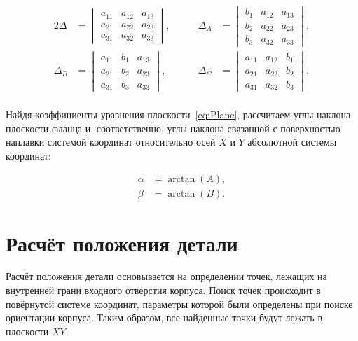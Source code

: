 \begin{alignat*}{2}
    \Delta &= \begin{vmatrix}
                  a_{11} & a_{12} & a_{13} \\
                  a_{21} & a_{22} & a_{23} \\
                  a_{31} & a_{32} & a_{33}
    \end{vmatrix}, & \qquad
    \Delta_A &= \begin{vmatrix}
                    b_1 & a_{12} & a_{13} \\
                    b_2 & a_{22} & a_{23} \\
                    b_3 & a_{32} & a_{33}
    \end{vmatrix}, \\
    \Delta_B &= \begin{vmatrix}
                    a_{11} & b_1 & a_{13} \\
                    a_{21} & b_2 & a_{23} \\
                    a_{31} & b_3 & a_{33}
    \end{vmatrix}, & \qquad
    \Delta_C &= \begin{vmatrix}
                    a_{11} & a_{12} & b_1 \\
                    a_{21} & a_{22} & b_2 \\
                    a_{31} & a_{32} & b_3
    \end{vmatrix}.
\end{alignat*} \\

Найдя коэффициенты уравнения плоскости~\ref{eq:Plane}, рассчитаем углы наклона плоскости фланца и, соответственно, углы наклона связанной с поверхностью наплавки системой координат относительно осей $X$ и $Y$ абсолютной системы координат:

\begin{align*}
    \alpha &= \arctan(A), \\
    \beta &= \arctan(B).
\end{align*}


\section{Расчёт положения детали}
Расчёт положения детали основывается на определении точек, лежащих на внутренней грани входного отверстия корпуса.
Поиск точек происходит в повёрнутой системе координат, параметры которой были определены при поиске ориентации корпуса.
Таким образом, все найденные точки будут лежать в плоскости $XY$.

